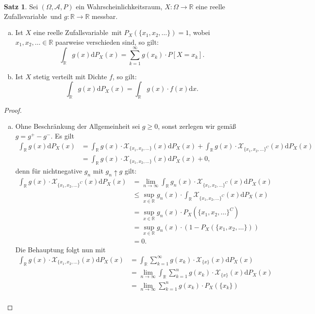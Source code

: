 \documentclass[a4paper,12pt,fleqn]{scrartcl}
\newcommand{\R}{\mathbb{R}}
\newcommand{\m}[1]{\mathcal{ #1 }}
\newcommand{\WR}{Wahrscheinlichkeitsraum}
\newcommand{\ZV}{Zufallsvariable}
\theoremstyle{definition}
\newtheorem{satz}[definition]{Satz}
\theoremstyle{plain}
\theoremstyle{remark}
\begin{document}
\begin{satz}
Sei $(\Omega, \m{A}, P)$ ein \WR, $X: \Omega \rightarrow \R$ eine reelle \ZV \, und $g: \R \rightarrow \R$ messbar.
\begin{enumerate}[a)]
\item Ist $X$ eine reelle \ZV \, mit $P_X(\{x_1, x_2, \ldots\}) = 1$, wobei $x_1, x_2, \ldots \in \R$ paarweise verschieden sind, so gilt:
\[\int_\R g(x) \mathrm{d}P_X(x) = \sum_{k=1}^\infty g(x_k) \cdot P[X = x_k].\]
\item Ist $X$ stetig verteilt mit Dichte $f$, so gilt:
\[\int_\R g(x) \mathrm{d}P_X(x) = \int_\R g(x) \cdot f(x) \mathrm{d}x.\]
\end{enumerate}
\end{satz}
\begin{proof}
\begin{enumerate}[a)]
\item Ohne Beschränkung der Allgemeinheit sei $g \geq 0$, sonst zerlegen wir gemäß $g = g^+ - g^-$. Es gilt
\begin{align*}
\int_\R g(x) \mathrm{d}P_X(x) &= \int_\R g(x) \cdot \m{X}_{\{x_1, x_2, \ldots\}} (x) \mathrm{d}P_X(x) + \int_\R g(x) \cdot \m{X}_{\{x_1, x_2, \ldots\}^C} (x) \mathrm{d}P_X(x) \\
&= \int_\R g(x) \cdot \m{X}_{\{x_1, x_2, \ldots\}} (x) \mathrm{d}P_X(x) + 0,
\end{align*}
denn für nichtnegative $g_n$ mit $g_n \uparrow g$ gilt:
\begin{align*}
\int_\R g(x) \cdot \m{X}_{\{x_1, x_2, \ldots\}^C} (x) \mathrm{d}P_X(x) &= \lim_{n \rightarrow \infty} \int_\R g_n(x) \cdot \m{X}_{\{x_1, x_2, \ldots\}^C} (x) \mathrm{d}P_X(x) \\
&\leq \sup_{x \in \R} g_n(x) \cdot \int_\R \m{X}_{\{x_1, x_2, \ldots\}^C} (x) \mathrm{d}P_X(x) \\
&= \sup_{x \in \R} g_n(x) \cdot P_X(\{x_1, x_2, \ldots\}^C) \\
&= \sup_{x \in \R} g_n(x) \cdot (1 - P_X(\{x_1, x_2, \ldots\})) \\
&= 0.
\end{align*}
Die Behauptung folgt nun mit
\begin{align*}
\int_\R g(x) \cdot \m{X}_{\{x_1, x_2, \ldots\}} (x) \mathrm{d}P_X(x) &= \int_\R \sum_{k=1}^\infty g(x_k) \cdot \m{X}_{\{x\}} (x) \mathrm{d}P_X(x) \\
&= \lim_{n \rightarrow \infty} \int_\R \sum_{k=1}^n g(x_k) \cdot \m{X}_{\{x\}} (x) \mathrm{d}P_X(x) \\
&= \lim_{n \rightarrow \infty} \sum_{k=1}^n g(x_k) \cdot P_X(\{x_k\}) \\

\end{align*}
\end{enumerate}
\end{proof}
\end{document}
